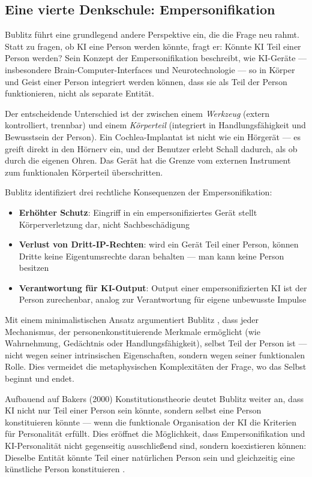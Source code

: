 \documentclass[acmcp, nonacm]{acmart}
\begin{document}
\subsection{Eine vierte Denkschule: Empersonifikation}

Bublitz \cite{Bublitz2024} führt eine grundlegend andere Perspektive ein, die die Frage neu rahmt. Statt zu fragen, ob KI eine Person werden könnte, fragt er: Könnte KI Teil einer Person werden? Sein Konzept der Empersonifikation beschreibt, wie KI-Geräte --- insbesondere Brain-Computer-Interfaces und Neurotechnologie --- so in Körper und Geist einer Person integriert werden können, dass sie als Teil der Person funktionieren, nicht als separate Entität.

Der entscheidende Unterschied ist der zwischen einem \emph{Werkzeug} (extern kontrolliert, trennbar) und einem \emph{Körperteil} (integriert in Handlungsfähigkeit und Bewusstsein der Person). Ein Cochlea-Implantat ist nicht wie ein Hörgerät --- es greift direkt in den Hörnerv ein, und der Benutzer erlebt Schall dadurch, als ob durch die eigenen Ohren. Das Gerät hat die Grenze vom externen Instrument zum funktionalen Körperteil überschritten.

Bublitz identifiziert drei rechtliche Konsequenzen der Empersonifikation:
\begin{itemize}
\item \textbf{Erhöhter Schutz}: Eingriff in ein empersonifiziertes Gerät stellt Körperverletzung dar, nicht Sachbeschädigung
\item \textbf{Verlust von Dritt-IP-Rechten}: wird ein Gerät Teil einer Person, können Dritte keine Eigentumsrechte daran behalten --- man kann keine Person besitzen
\item \textbf{Verantwortung für KI-Output}: Output einer empersonifizierten KI ist der Person zurechenbar, analog zur Verantwortung für eigene unbewusste Impulse
\end{itemize}

Mit einem minimalistischen Ansatz argumentiert Bublitz \cite{Bublitz2024}, dass jeder Mechanismus, der personenkonstituierende Merkmale ermöglicht (wie Wahrnehmung, Gedächtnis oder Handlungsfähigkeit), selbst Teil der Person ist --- nicht wegen seiner intrinsischen Eigenschaften, sondern wegen seiner funktionalen Rolle. Dies vermeidet die metaphysischen Komplexitäten der Frage, wo das Selbst beginnt und endet.

Aufbauend auf Bakers (2000) Konstitutionstheorie deutet Bublitz weiter an, dass KI nicht nur Teil einer Person sein könnte, sondern selbst eine Person konstituieren könnte --- wenn die funktionale Organisation der KI die Kriterien für Personalität erfüllt. Dies eröffnet die Möglichkeit, dass Empersonifikation und KI-Personalität nicht gegenseitig ausschließend sind, sondern koexistieren können: Dieselbe Entität könnte Teil einer natürlichen Person sein und gleichzeitig eine künstliche Person konstituieren \cite{Bublitz2024}.
\end{document}
